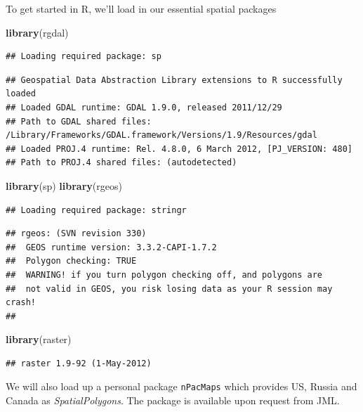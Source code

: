 \documentclass[]{article}
\newenvironment{Shaded}{}{}
\newcommand{\KeywordTok}[1]{\textcolor[rgb]{0.00,0.44,0.13}{\textbf{{#1}}}}
\newcommand{\NormalTok}[1]{{#1}}
\begin{document}
To get started in R, we'll load in our essential spatial packages

\begin{Shaded}
\begin{Highlighting}[]
\KeywordTok{library}\NormalTok{(rgdal)}
\end{Highlighting}
\end{Shaded}
\begin{verbatim}
## Loading required package: sp
\end{verbatim}

\begin{verbatim}
## Geospatial Data Abstraction Library extensions to R successfully loaded
## Loaded GDAL runtime: GDAL 1.9.0, released 2011/12/29
## Path to GDAL shared files: /Library/Frameworks/GDAL.framework/Versions/1.9/Resources/gdal
## Loaded PROJ.4 runtime: Rel. 4.8.0, 6 March 2012, [PJ_VERSION: 480]
## Path to PROJ.4 shared files: (autodetected)
\end{verbatim}

\begin{Shaded}
\begin{Highlighting}[]
\KeywordTok{library}\NormalTok{(sp)}
\KeywordTok{library}\NormalTok{(rgeos)}
\end{Highlighting}
\end{Shaded}
\begin{verbatim}
## Loading required package: stringr
\end{verbatim}

\begin{verbatim}
## rgeos: (SVN revision 330)
##  GEOS runtime version: 3.3.2-CAPI-1.7.2 
##  Polygon checking: TRUE 
##  WARNING! if you turn polygon checking off, and polygons are
##  not valid in GEOS, you risk losing data as your R session may crash! 
## 
\end{verbatim}

\begin{Shaded}
\begin{Highlighting}[]
\KeywordTok{library}\NormalTok{(raster)}
\end{Highlighting}
\end{Shaded}
\begin{verbatim}
## raster 1.9-92 (1-May-2012)
\end{verbatim}

We will also load up a personal package \texttt{nPacMaps} which provides
US, Russia and Canada as \emph{SpatialPolygons}. The package is
available upon request from JML.
\end{document}
